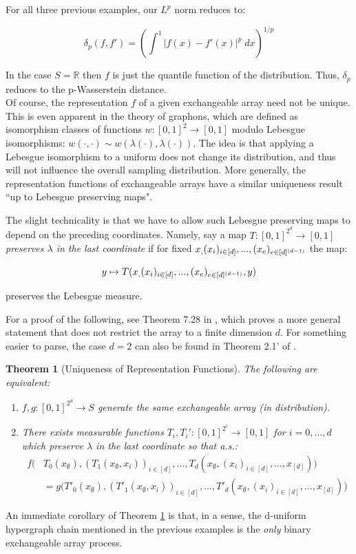 \documentclass[11pt,oneside,reqno]{article}
\theoremstyle{plain}
\newtheorem{theorem}{Theorem}[section]
\theoremstyle{definition}
\numberwithin{equation}{section}
\renewcommand{\cite}{\citet}
\newcommand{\R}{\mathbb{R}}
\begin{document}
\noindent For all three previous examples, our $L^p$ norm reduces to:

\[\delta_p(f,f') = \left(\int^1 | f(x) - f'(x)|^p \; dx \right)^{1/p}\]

\noindent In the case $S = \R$ then $f$ is just the quantile function of the distribution. Thus, $\delta_p$ reduces to the p-Wasserstein distance.\\


\noindent Of course, the representation $f$ of a given exchangeable array need not be unique. This is even apparent in the theory of graphons, which are defined as isomorphism classes of functions $w:[0,1]^2 \to [0,1]$ modulo Lebesgue isomorphisms: $w(\cdot, \cdot) \sim w(\lambda(\cdot), \lambda(\cdot))$. The idea is that applying a Lebesgue isomorphism to a uniform does not change its distribution, and thus will not influence the overall sampling distribution. More generally, the representation functions of exchangeable arrays have a similar uniqueness result ``up to Lebesgue preserving maps". 

The slight technicality is that we have to allow such Lebesgue preserving maps to depend on the preceding coordinates. Namely, say a map $T:[0,1]^{2^d} \to [0,1]$ \textit{preserves $\lambda$ in the last coordinate} if for fixed $x_\empty, (x_i)_{i \in [d]}, ..., (x_e)_{e \in [d]^{(d-1)}}$ the map:

\[y \mapsto T(x_\empty, (x_i)_{i \in [d]}, ..., (x_e)_{e \in [d]^{(d-1)}}, y)\]

\noindent preserves the Lebesgue measure.


For a proof of the following, see Theorem 7.28 in \cite{KallenbergProbabilisticSymmetries}, which proves a more general statement that does not restrict the array to a finite dimension $d$. For something easier to parse, the case $d=2$ can also be found in Theorem 2.1' of \cite{kallenberg_rep_thm}.
%
\begin{theorem}[Uniqueness of Representation Functions]
    The following are equivalent:
    \begin{enumerate}
        \item $f,g:[0,1]^{2^d} \to S$ generate the same exchangeable array (in distribution).

        \item There exists measurable functions $T_i,T_i' : [0,1]^{2^i} \to [0,1]$  for  $i = 0,..., d$ which preserve $\lambda$ in the last coordinate so that a.s.:
        \begin{align*}
          f\Big( & T_0(x_\emptyset), (T_1(x_\emptyset, x_i))_{i \in [d]}, \dots, T_d(x_\emptyset, (x_i)_{i \in [d]}, \dots, x_{[d]}) \Big)  \\
          & = g\Big(  T'_0(x_\emptyset), (T'_1(x_\emptyset, x_i))_{i \in [d]}, \dots,  T'_d(x_\emptyset, (x_i)_{i \in [d]}, \dots, x_{[d]}) \Big)
        \end{align*}
    \end{enumerate}
    \label{thm:uniqueness_of_rep_functions}
\end{theorem}
%
An immediate corollary of Theorem \ref{thm:uniqueness_of_rep_functions} is that, in a sense, the d-uniform hypergraph chain mentioned in the previous examples is the \textit{only} binary exchangeable array process.
\end{document}

